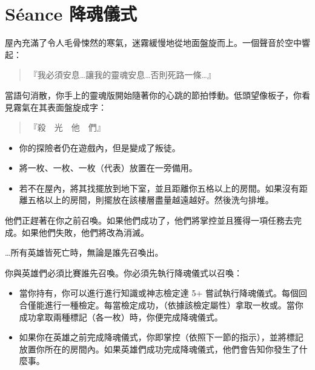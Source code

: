 
\chapter{Séance 降魂儀式}

\begin{HauntStory}
  屋內充滿了令人毛骨悚然的寒氣，迷霧緩慢地從地面盤旋而上。一個聲音於空中響起：

  \begin{quote}
    『我必須安息…讓我的靈魂安息…否則死路一條…』
  \end{quote}

  當語句消散，你手上的靈魂版開始隨著你的心跳的節拍悸動。低頭望像板子，你看見霧氣在其表面盤旋成字：

  \begin{quote}
    『殺　光　他　們』
  \end{quote}
\end{HauntStory}

\vspace*{-1em}
\begin{itemize}
  \item 你的探險者仍在遊戲內，但是變成了叛徒。
  \item 將一枚、一枚、一枚（代表）放置在一旁備用。
  \item 若不在屋內，將其找擺放到地下室，並且距離你五格以上的房間。如果沒有距離五格以上的房間，則擺放在該樓層盡量越遠越好。然後洗勻排堆。
\end{itemize}

他們正趕著在你之前召喚。如果他們成功了，他們將掌控並且獲得一項任務去完成。如果他們失敗，他們將改為消滅。

…所有英雄皆死亡時，無論是誰先召喚出。

你與英雄們必須比賽誰先召喚。你必須先執行降魂儀式以召喚：
\begin{itemize}
  \item 當你持有，你可以進行進行知識或神志檢定達 5+ 嘗試執行降魂儀式。每個回合僅能進行一種檢定。每當檢定成功，（依據該檢定屬性）拿取一枚或。當你成功拿取兩種標記（各一枚）時，你便完成降魂儀式。
  \item 如果你在英雄之前完成降魂儀式，你即掌控（依照下一節的指示），並將標記放置你所在的房間內。如果英雄們成功完成降魂儀式，他們會告知你發生了什麼事。
\end{itemize}

